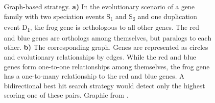 \begin{figure}[t]
	\centering
	\def\svgwidth{0.8\textwidth}
	
	\caption[Graph-based strategy]{Graph-based strategy. 
		\textbf{a)} In the evolutionary scenario of a gene family with two speciation
			events S\textsubscript{1} and S\textsubscript{2} and one duplication event
			D\textsubscript{1}, the frog gene is orthologous to all other genes. The
			red and blue genes are orthologs among themselves, but paralogs to each
			other.
		\textbf{b)} The corresponding graph. Genes are represented as circles and
			evolutionary relationships by edges. While the red and blue genes form
			one-to-one relationships among themselves, the frog gene has a one-to-many
			relationship to the red and blue genes. A bidirectional best hit search
			strategy would detect only the highest scoring one of these pairs.
		Graphic from \cite{altenhoff2012-1}.
	}
	\label{fig:graph-based-strat}
\end{figure}

